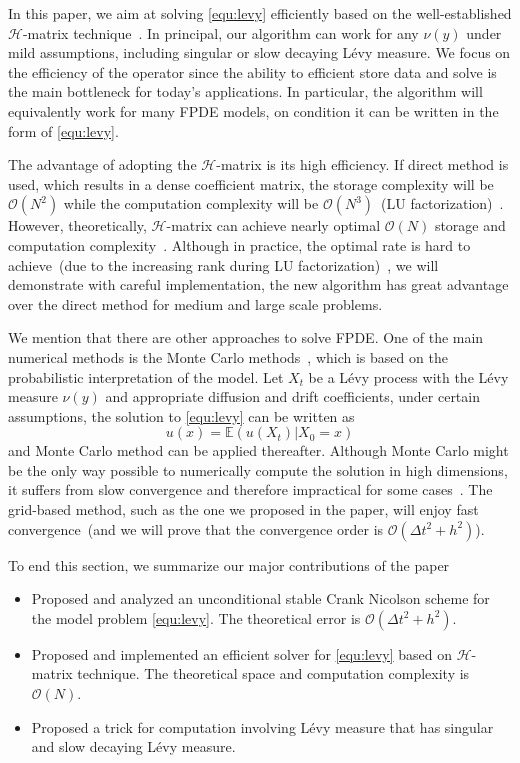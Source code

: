 \documentclass[3p,,preprint,12pt]{elsarticle}
\theoremstyle{definition}
\begin{document}
In this paper, we aim at solving \cref{equ:levy} efficiently based on the well-established $\mathcal{H}$-matrix technique~\cite{bebendorf2008hierarchical,borm2003introduction}. In principal, our algorithm can work for any $\nu(y)$ under mild assumptions, including singular or slow decaying L\'evy measure. We focus on the efficiency of the operator since the ability to efficient store data and solve is the main bottleneck for today's applications. In particular, the algorithm will equivalently work for many FPDE models, on condition it can be written in the form of \cref{equ:levy}. 

The advantage of adopting the $\mathcal{H}$-matrix is its high efficiency. If direct method is used, which results in a dense coefficient matrix, the storage complexity will be $\mathcal{O}(N^2)$ while the computation complexity will be $\mathcal{O}(N^3)$~(LU factorization)~\cite{golub2012matrix}. However, theoretically, $\mathcal{H}$-matrix can achieve nearly optimal $\mathcal{O}(N)$ storage and computation complexity~\cite{borm2003introduction,bebendorf2008hierarchical}. Although in practice, the optimal rate is hard to achieve~(due to the increasing rank during LU factorization)~\cite{pouransari2017fast}, we will demonstrate with careful implementation, the new algorithm has great advantage over the direct method for medium and large scale problems. 

We mention that there are other approaches to solve FPDE. One of the main numerical methods is the Monte Carlo methods~\cite{metropolis1989monte}, which is based on the probabilistic interpretation of the model. Let $X_t$ be a L\'evy process with the L\'evy measure $\nu(y)$ and appropriate diffusion and drift coefficients, under certain assumptions, the solution to \cref{equ:levy} can be written as~\cite{MichaelC25:online}
\begin{equation}
	u(x) = \mathbb{E}(u(X_t)|X_0=x)
\end{equation}
and Monte Carlo method can be applied thereafter. Although Monte Carlo might be the only way possible to numerically compute the solution in high dimensions, it suffers from slow convergence and therefore impractical for some cases~\cite{hammersley2013monte}. The grid-based method, such as the one we proposed in the paper, will enjoy fast convergence~(and we will prove that the convergence order is $\mathcal{O}(\Delta t^2+h^2)$). 

To end this section, we summarize our major contributions of the paper
\begin{itemize}
	\item Proposed and analyzed an unconditional stable Crank Nicolson scheme for the model problem \cref{equ:levy}. The theoretical error is $\mathcal{O}(\Delta t^2 + h^2)$.
	\item Proposed and implemented an efficient solver for \cref{equ:levy} based on  $\mathcal{H}$-matrix technique. The theoretical space and computation complexity is $\mathcal{O}(N)$. 
	\item Proposed a trick for computation involving L\'evy measure that has singular and slow decaying L\'evy measure.
\end{itemize}
\end{document}
